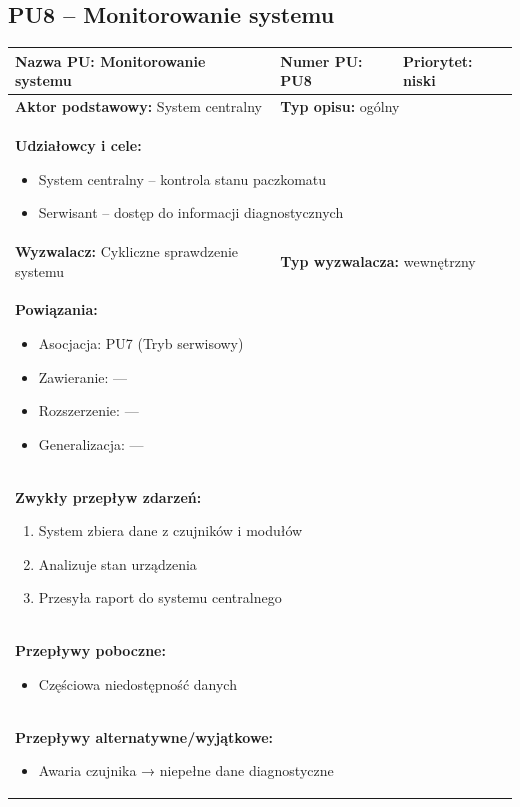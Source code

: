 \documentclass[a4paper,12pt]{article}
\begin{document}
\vspace{1cm}

\subsection{PU8 – Monitorowanie systemu}

\begin{tabular}{|p{6cm}|p{4cm}|p{5cm}|}
\hline
\textbf{Nazwa PU:} Monitorowanie systemu &
\textbf{Numer PU:} PU8 &
\textbf{Priorytet:} niski \\
\hline
\textbf{Aktor podstawowy:} System centralny &
\multicolumn{2}{p{9cm}|}{\textbf{Typ opisu:} ogólny} \\
\hline
\multicolumn{3}{|p{15cm}|}{
\textbf{Udziałowcy i cele:}
\begin{itemize}
\item System centralny – kontrola stanu paczkomatu
\item Serwisant – dostęp do informacji diagnostycznych
\end{itemize}
} \\
\hline
\textbf{Wyzwalacz:} Cykliczne sprawdzenie systemu &
\multicolumn{2}{p{9cm}|}{\textbf{Typ wyzwalacza:} wewnętrzny} \\
\hline
\multicolumn{3}{|p{15cm}|}{
\textbf{Powiązania:}
\begin{itemize}
\item Asocjacja: PU7 (Tryb serwisowy)
\item Zawieranie: —
\item Rozszerzenie: —
\item Generalizacja: —
\end{itemize}
} \\
\hline
\multicolumn{3}{|p{15cm}|}{
\textbf{Zwykły przepływ zdarzeń:}
\begin{enumerate}
\item System zbiera dane z czujników i modułów
\item Analizuje stan urządzenia
\item Przesyła raport do systemu centralnego
\end{enumerate}
} \\
\hline
\multicolumn{3}{|p{15cm}|}{
\textbf{Przepływy poboczne:}
\begin{itemize}
\item Częściowa niedostępność danych
\end{itemize}
} \\
\hline
\multicolumn{3}{|p{15cm}|}{
\textbf{Przepływy alternatywne/wyjątkowe:}
\begin{itemize}
\item Awaria czujnika → niepełne dane diagnostyczne
\end{itemize}
} \\
\hline
\end{tabular}
\end{document}
